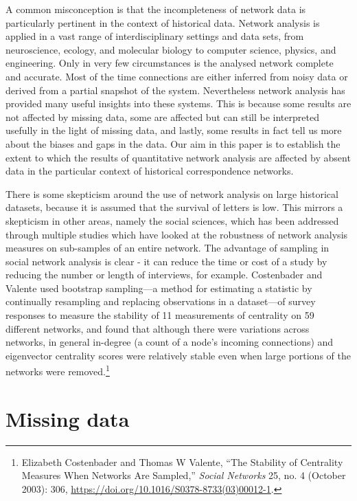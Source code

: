 \documentclass[]{article}
\begin{document}
A common misconception is that the incompleteness of network data is particularly pertinent in the context of historical data. Network analysis is applied in a vast range of interdisciplinary settings and data sets, from neuroscience, ecology, and molecular biology to computer science, physics, and engineering. Only in very few circumstances is the analysed network complete and accurate. Most of the time connections are either inferred from noisy data or derived from a partial snapshot of the system. Nevertheless network analysis has provided many useful insights into these systems. This is because some results are not affected by missing data, some are affected but can still be interpreted usefully in the light of missing data, and lastly, some results in fact tell us more about the biases and gaps in the data. Our aim in this paper is to establish the extent to which the results of quantitative network analysis are affected by absent data in the particular context of historical correspondence networks.

There is some skepticism around the use of network analysis on large historical datasets, because it is assumed that the survival of letters is low. This mirrors a skepticism in other areas, namely the social sciences, which has been addressed through multiple studies which have looked at the robustness of network analysis measures on sub-samples of an entire network. The advantage of sampling in social network analysis is clear - it can reduce the time or cost of a study by reducing the number or length of interviews, for example. Costenbader and Valente used bootstrap sampling---a method for estimating a statistic by continually resampling and replacing observations in a dataset---of survey responses to measure the stability of 11 measurements of centrality on 59 different networks, and found that although there were variations across networks, in general in-degree (a count of a node's incoming connections) and eigenvector centrality scores were relatively stable even when large portions of the networks were removed.\footnote{Elizabeth Costenbader and Thomas W Valente, ``The Stability of Centrality Measures When Networks Are Sampled,'' \emph{Social Networks} 25, no. 4 (October 2003): 306, \url{https://doi.org/10.1016/S0378-8733(03)00012-1}.}

\hypertarget{missing-data}{%
\section{Missing data}\label{missing-data}}
\end{document}
